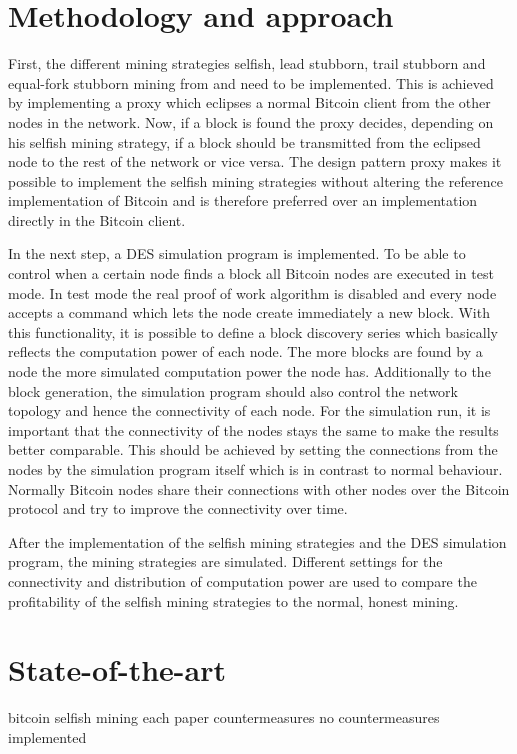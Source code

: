 \documentclass{scrartcl}
\begin{document}
\section{Methodology and approach}
First, the different mining strategies selfish, lead stubborn, trail stubborn and equal-fork stubborn mining from \citeauthor{nayak2016stubborn} and \citeauthor{eyal2014majority} need to be implemented. This is achieved by implementing a proxy which eclipses a normal Bitcoin client from the other nodes in the network. Now, if a block is found the proxy decides, depending on his selfish mining strategy, if a block should be transmitted from the eclipsed node to the rest of the network or vice versa. The design pattern proxy makes it possible to implement the selfish mining strategies without altering the reference implementation of Bitcoin and is therefore preferred over an implementation directly in the Bitcoin client.

In the next step, a DES simulation program is implemented. To be able to control when a certain node finds a block all Bitcoin nodes are executed in test mode. In test mode the real proof of work algorithm is disabled and every node accepts a command which lets the node create immediately a new block. With this functionality, it is possible to define a block discovery series which basically reflects the computation power of each node. The more blocks are found by a node the more simulated computation power the node has. Additionally to the block generation, the simulation program should also control the network topology and hence the connectivity of each node. For the simulation run, it is important that the connectivity of the nodes stays the same to make the results better comparable. This should be achieved by setting the connections from the nodes by the simulation program itself which is in contrast to normal behaviour. Normally Bitcoin nodes share their connections with other nodes over the Bitcoin protocol and try to improve the connectivity over time.

After the implementation of the selfish mining strategies and the DES simulation program, the mining strategies are simulated. Different settings for the connectivity and distribution of computation power are used to compare the profitability of the selfish mining strategies to the normal, honest mining.
\section{State-of-the-art}
bitcoin
selfish mining
each paper
countermeasures
no countermeasures implemented
\end{document}
